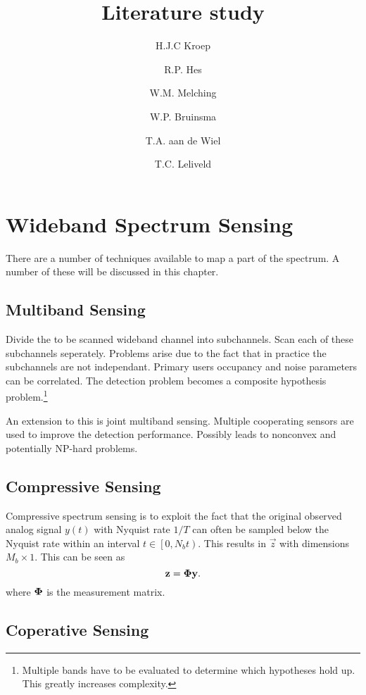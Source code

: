 \documentclass[report]{memoir}
\title{Literature study}
\author{H.J.C Kroep \and R.P. Hes \and W.M. Melching \and W.P. Bruinsma \and T.A. aan de Wiel \and T.C. Leliveld}
\begin{document}
\chapter{Wideband Spectrum Sensing}
There are a number of techniques available to map a part of the spectrum. A number of these will be discussed in this chapter.

\section{Multiband Sensing}
Divide the to be scanned wideband channel into subchannels. Scan each of these subchannels seperately. Problems arise due to the fact that in practice the subchannels are not independant. Primary users occupancy and noise parameters can be correlated. The detection problem becomes a composite hypothesis problem.\footnote{Multiple bands have to be evaluated to determine which hypotheses hold up. This greatly increases complexity.}

An extension to this is joint multiband sensing. Multiple cooperating sensors are used to improve the detection performance. Possibly leads to nonconvex and potentially NP-hard problems.

\section{Compressive Sensing}
Compressive spectrum sensing is to exploit the fact that the original observed analog signal $y(t)$ with Nyquist rate $1/T$ can often be sampled below the Nyquist rate within an interval $t\in \left[0,N_{b}t \right)$. This results in $\vec{z}$ with dimensions $M_b \times 1$. This can be seen as 
\begin{equation}
    \label{eq:nonuniformsampling}
    \boldsymbol{\mathbf{z}} = \boldsymbol{\mathbf{\Phi}}\boldsymbol{\mathbf{y}}.
\end{equation}
where $\boldsymbol{\mathbf{\Phi}}$ is the measurement matrix.

\section{Coperative Sensing}
\end{document}
